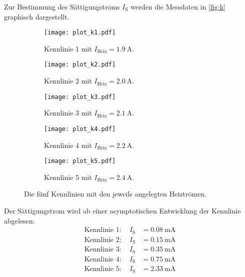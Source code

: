 Zur Bestimmung des Sättigungstroms $I_{\text{S}}$ werden die Messdaten in \autoref{fig:k} graphisch dargestellt.
\begin{figure}
  \centering
  
  \begin{subfigure}{0.49\columnwidth}
  \centering
  \texttt{[image: plot\_k1.pdf]}
  \caption{Kennlinie 1 mit $I_\text{Heiz} = \qty{1,9}{\ampere}$.}
  \label{fig:k1}
  \end{subfigure}\hfill
  \begin{subfigure}{0.49\columnwidth}
  \centering
  \texttt{[image: plot\_k2.pdf]}
  \caption{Kennlinie 2 mit $I_\text{Heiz} = \qty{2,0}{\ampere}$.}
  \label{fig:k2}
  \end{subfigure}
  
  \medskip
  
  \begin{subfigure}{0.49\columnwidth}
  \centering
  \texttt{[image: plot\_k3.pdf]}
  \caption{Kennlinie 3 mit $I_\text{Heiz} = \qty{2,1}{\ampere}$.}
  \label{fig:k3}
  \end{subfigure}\hfill
  \begin{subfigure}{0.49\columnwidth}
  \centering
  \texttt{[image: plot\_k4.pdf]}
  \caption{Kennlinie 4 mit $I_\text{Heiz} = \qty{2,2}{\ampere}$.}
  \label{fig:k4}
  \end{subfigure}
  
  \medskip
  
  \begin{subfigure}{0.7\columnwidth}
  \centering
  \texttt{[image: plot\_k5.pdf]}
  \caption{Kennlinie 5 mit $I_\text{Heiz} = \qty{2,4}{\ampere}$.}
  \label{fig:k5}
  \end{subfigure}

  \caption{Die fünf Kennlinien mit den jeweils angelegten Heiztrömen.}
  \label{fig:k}

\end{figure}

Der Sättigungstrom wird ab einer asymptotischen Entwicklung der Kennlinie abgelesen:
\begin{align*}
  \text{Kennlinie 1} : \quad I_\text{S} &= \qty{0,08}{\milli\ampere} \\
  \text{Kennlinie 2} : \quad I_\text{S} &= \qty{0,15}{\milli\ampere} \\
  \text{Kennlinie 3} : \quad I_\text{S} &= \qty{0,35}{\milli\ampere} \\
  \text{Kennlinie 4} : \quad I_\text{S} &= \qty{0,75}{\milli\ampere} \\
  \text{Kennlinie 5} : \quad I_\text{S} &= \qty{2,33}{\milli\ampere}
\end{align*}


